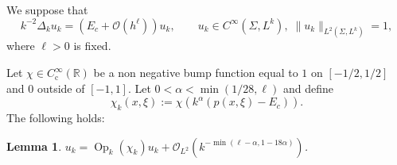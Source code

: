 \documentclass[10pt]{amsart}
\theoremstyle{plain}
\newtheorem{lemma}[theorem]{Lemma}
\theoremstyle{definition}
\let\mc\mathcal
\newcommand{\R}{\mathbb{R}}
\DeclareMathOperator{\comp}{c}
\DeclareMathOperator{\Op}{Op}
\begin{document}
We suppose that
\begin{equation}
\label{equation:to-use}
k^{-2}\Delta_k u_k = (E_c+\mc{O}(h^\ell))u_k, \qquad u_k \in C^\infty(\Sigma,L^{k}),\; \|u_k\|_{L^2(\Sigma,L^{k})} = 1,
\end{equation}
where $\ell > 0$ is fixed.

Let $\chi \in C^\infty_{\comp}(\R)$ be a non negative bump function equal to $1$ on $[-1/2,1/2]$ and $0$ outside of $[-1,1]$. Let $0 < \alpha < \min(1/28,\ell)$ and define
\[
\chi_k(x,\xi) := \chi(k^\alpha (p(x,\xi)-E_c)).
\]
The following holds:

\begin{lemma} \label{lemma:1} $u_k = \Op_k(\chi_k)u_k + \mc{O}_{L^2}(k^{-\min(\ell-\alpha,1-18\alpha)})$. \end{lemma}
\end{document}
